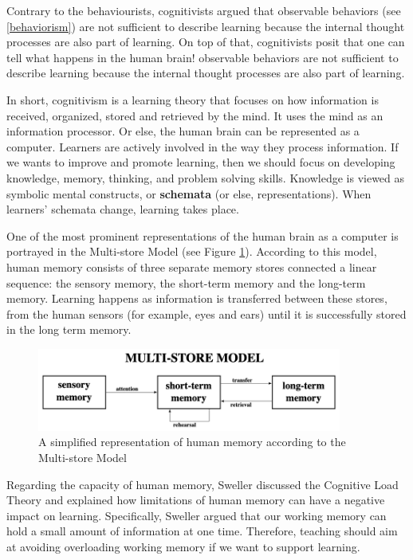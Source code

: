 \documentclass[
]{book}
\begin{document}
Contrary to the behaviourists, cognitivists argued that observable behaviors (see \ref{behaviorism}) are not sufficient to describe learning because the internal thought processes are also part of learning. On top of that, cognitivists posit that one can tell what happens in the human brain!
observable behaviors are not sufficient to describe learning because the internal thought processes are also part of learning.

In short, cognitivism is a learning theory that focuses on how information is received, organized, stored and retrieved by the mind. It uses the mind as an information processor. Or else, the human brain can be represented as a computer. Learners are actively involved in the way they process information. If we wants to improve and promote learning, then we should focus on developing knowledge, memory, thinking, and problem solving skills. Knowledge is viewed as symbolic mental constructs, or \textbf{schemata} (or else, representations). When learners' schemata change, learning takes place.

One of the most prominent representations of the human brain as a computer is portrayed in the Multi-store Model \citep{atkinson1968human} (see Figure \ref{fig:multistoremodel}). According to this model, human memory consists of three separate memory stores connected a linear sequence: the sensory memory, the short-term memory and the long-term memory. Learning happens as information is transferred between these stores, from the human sensors (for example, eyes and ears) until it is successfully stored in the long term memory.

\begin{figure}
\includegraphics[width=10cm]{./images/multistoremodel} \caption{A simplified representation of human memory according to the Multi-store Model}\label{fig:multistoremodel}
\end{figure}

Regarding the capacity of human memory, Sweller \citep{sweller1994cognitive} discussed the Cognitive Load Theory and explained how limitations of human memory can have a negative impact on learning. Specifically, Sweller argued that our working memory can hold a small amount of information at one time. Therefore, teaching should aim at avoiding overloading working memory if we want to support learning.
\end{document}
